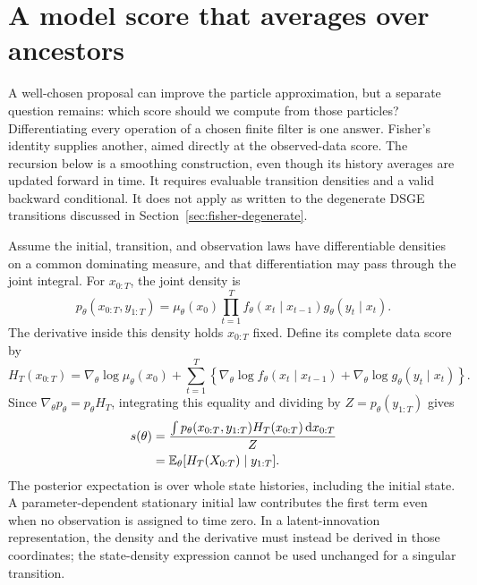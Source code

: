 \documentclass[11pt]{article}
\newcommand{\dd}{\mathrm{d}}
\begin{document}
\section{A model score that averages over ancestors}
\label{sec:fisher}

A well-chosen proposal can improve the particle approximation, but a separate question
remains: which score should we compute from those particles? Differentiating
every operation of a chosen finite filter is one answer. Fisher's identity
supplies another, aimed directly at the observed-data score. The recursion
below is a smoothing construction, even though its history averages are
updated forward in time. It requires evaluable transition densities and a
valid backward conditional. It does not apply as written to the degenerate
DSGE transitions discussed in Section~\ref{sec:fisher-degenerate}.

Assume the initial, transition, and observation laws have differentiable
densities on a common dominating measure, and that differentiation may pass
through the joint integral. For $x_{0:T}$, the joint density is
\begin{equation}
 p_\theta(x_{0:T},y_{1:T})
 =\mu_\theta(x_0)\prod_{t=1}^T
       f_\theta(x_t\mid x_{t-1})g_\theta(y_t\mid x_t).
 \label{eq:joint-model-density}
\end{equation}
The derivative inside this density holds $x_{0:T}$ fixed. Define its complete
data score by
\begin{equation}
 H_T(x_{0:T})=\nabla_\theta\log\mu_\theta(x_0)
 +\sum_{t=1}^T\left\{
    \nabla_\theta\log f_\theta(x_t\mid x_{t-1})
   +\nabla_\theta\log g_\theta(y_t\mid x_t)\right\}.
 \label{eq:complete-data-score}
\end{equation}
Since $\nabla_\theta p_\theta=p_\theta H_T$, integrating this equality and
dividing by $Z=p_\theta(y_{1:T})$ gives
\begin{align}
 s(\theta)
 &=\frac{\int p_\theta(x_{0:T},y_{1:T})H_T(x_{0:T})\,\dd x_{0:T}}{Z}
 \notag\\
 &=\mathbb E_\theta[H_T(X_{0:T})\mid y_{1:T}].
 \label{eq:fisher-model-score}
\end{align}
The posterior expectation is over whole state histories, including the
initial state. A parameter-dependent stationary initial law contributes the
first term even when no observation is assigned to time zero. In a
latent-innovation representation, the density and the derivative must instead
be derived in those coordinates; the state-density expression cannot be used
unchanged for a singular transition.
\end{document}
